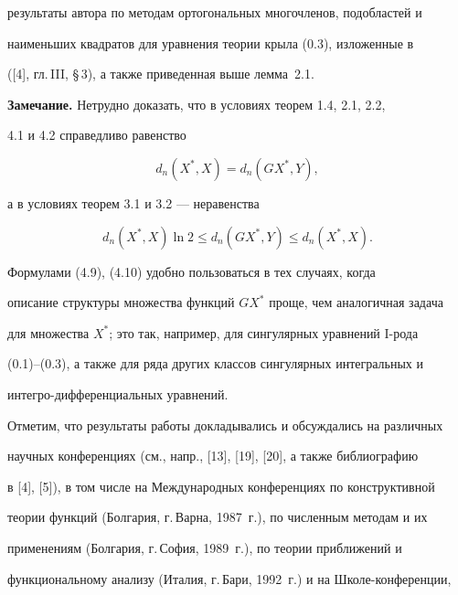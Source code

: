 результаты автора по методам ортогональных многочленов, подобластей и


наименьших квадратов для уравнения теории крыла (0.3), изложенные в


([4], гл.\,III, \S\,3), а также приведенная выше лемма~2.1.


\medskip





{\bf Замечание.} Нетрудно доказать, что в условиях теорем 1.4, 2.1, 2.2,


4.1 и 4.2 справедливо равенство


\begin{equation}


d_n(X^*,X)=d_n(GX^*,Y),


\end{equation}


а в условиях теорем 3.1 и 3.2 --- неравенства


\begin{equation}


d_n(X^*,X)\ln 2\leq d_n(GX^*,Y)\leq d_n(X^*,X).


\end{equation}


Формулами (4.9), (4.10) удобно пользоваться в тех случаях, когда


описание структуры множества функций $GX^*$ проще, чем аналогичная задача


для множества $X^*$; это так, например, для сингулярных уравнений I-рода


(0.1)--(0.3), а также для ряда других классов сингулярных интегральных и


интегро-дифференциальных уравнений.


\medskip





Отметим, что результаты работы докладывались и обсуждались на различных


научных конференциях (см., напр., [13], [19], [20], а также библиографию


в [4], [5]), в том числе на Международных конференциях по конструктивной


теории функций (Болгария, г.\,Варна, 1987~г.), по численным методам и их


применениям (Болгария, г.\,София, 1989~г.), по теории приближений и


функциональному анализу (Италия, г.\,Бари, 1992~г.) и на Школе-конференции,


